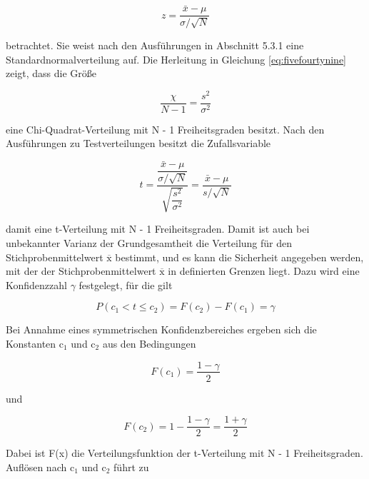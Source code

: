 \begin{equation}\label{eq:fivefourtyeight}
z=\dfrac{\bar{x}-\mu }{\sigma /\sqrt{N}}
\end{equation}

\noindent betrachtet. Sie weist nach den Ausf\"{u}hrungen in Abschnitt 5.3.1 eine Standardnormalverteilung auf. Die Herleitung in Gleichung \eqref{eq:fivefourtynine} zeigt, dass die Gr\"{o}{\ss}e 

\begin{equation}\label{eq:fivefourtynine}
\dfrac{\chi }{N-1} =\dfrac{s^{2} }{\sigma ^{2}}
\end{equation}

\noindent eine Chi-Quadrat-Verteilung mit N - 1 Freiheitsgraden besitzt. Nach den Ausf\"{u}hrungen zu Testverteilungen besitzt die Zufallsvariable

\begin{equation}\label{eq:fivefifty}
t=\dfrac{\dfrac{\bar{x}-\mu}{\sigma /\sqrt{N}}}{\sqrt{\dfrac{s^{2}}{\sigma ^{2}} } } =\dfrac{\bar{x}-\mu}{s/\sqrt{N}}
\end{equation}

\noindent damit eine t-Verteilung mit N - 1 Freiheitsgraden. Damit ist auch bei unbekannter Varianz der Grundgesamtheit die Verteilung f\"{u}r den Stichprobenmittelwert $\overline{\mathrm{x}}$ bestimmt, und es kann die Sicherheit angegeben werden, mit der der Stichprobenmittelwert $\overline{\mathrm{x}}$ in definierten Grenzen liegt. Dazu wird eine Konfidenzzahl $\gamma$ festgelegt, f\"{u}r die gilt

\begin{equation}\label{eq:fivefiftyone}
P\left(c_{1} <t\le c_{2} \right)=F\left(c_{2} \right)-F\left(c_{1} \right)=\gamma
\end{equation}

\noindent Bei Annahme eines symmetrischen Konfidenzbereiches ergeben sich die Konstanten c$_{1}$ und c$_{2}$ aus den Bedingungen

\begin{equation}\label{eq:fivefiftytwo}
F\left(c_{1} \right)=\dfrac{1-\gamma}{2}
\end{equation}

\noindent und 

\begin{equation}\label{eq:fivefiftythree}
F\left(c_{2} \right)=1-\dfrac{1-\gamma}{2} =\dfrac{1+\gamma}{2}
\end{equation}

\noindent Dabei ist F(x) die Verteilungsfunktion der t-Verteilung mit N - 1 Freiheitsgraden. Aufl\"{o}sen nach c$_{1}$ und c$_{2}$ f\"{u}hrt zu


